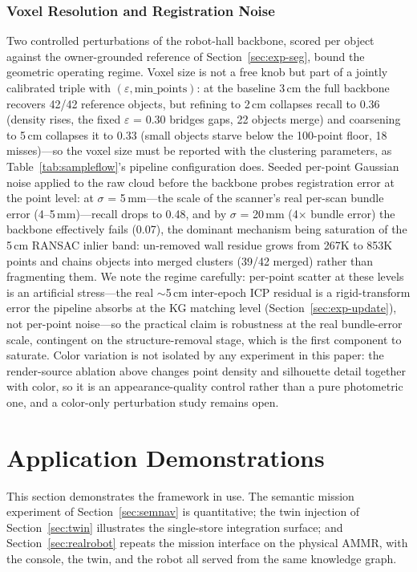 \documentclass[electronics,article,accept,pdftex,moreauthors]{Definitions/mdpi}
\begin{document}
\subsubsection{Voxel Resolution and Registration Noise}
Two controlled perturbations of the robot-hall backbone, scored per
object against the owner-grounded reference of
Section~\ref{sec:exp-seg}, bound the geometric operating regime. Voxel
size is not a free knob but part of a jointly calibrated triple with
$(\varepsilon, \mathrm{min\_points})$: at the baseline 3\,cm the full
backbone recovers 42/42 reference objects, but refining to 2\,cm
collapses recall to 0.36 (density rises, the fixed
$\varepsilon$ {=} 0.30 bridges gaps, 22 objects merge) and coarsening to
5\,cm collapses it to 0.33 (small objects starve below the 100-point
floor, 18 misses)---so the voxel size must be reported with the
clustering parameters, as Table~\ref{tab:sampleflow}'s pipeline
configuration does. Seeded per-point Gaussian noise applied to the raw
cloud before the backbone probes registration error at the point
level: at $\sigma$ {=} 5\,mm---the scale of the scanner's real per-scan
bundle error (4--5\,mm)---recall drops to 0.48, and by
$\sigma$ {=} 20\,mm (4$\times$ bundle error) the backbone effectively
fails (0.07), the dominant mechanism being saturation of the 5\,cm
RANSAC inlier band: un-removed wall residue grows from 267K to 853K
points and chains objects into merged clusters (39/42 merged) rather
than fragmenting them. We note the regime carefully: per-point scatter
at these levels is an artificial stress---the real $\sim$5\,cm
inter-epoch ICP residual is a rigid-transform error the pipeline
absorbs at the KG matching level (Section~\ref{sec:exp-update}), not
per-point noise---so the practical claim is robustness at the real
bundle-error scale, contingent on the structure-removal stage, which
is the first component to saturate. Color variation is not isolated by
any experiment in this paper: the render-source ablation above changes
point density and silhouette detail together with color, so it is an
appearance-quality control rather than a pure photometric one, and a
color-only perturbation study remains open.


\section{Application Demonstrations}
\label{sec:applications}

This section demonstrates the framework in use. The semantic mission
experiment of Section~\ref{sec:semnav} is quantitative; the twin injection
of Section~\ref{sec:twin} illustrates the single-store integration surface;
and Section~\ref{sec:realrobot} repeats the mission interface on the
physical AMMR, with the console, the twin, and the robot all served from
the same knowledge graph.
\end{document}
